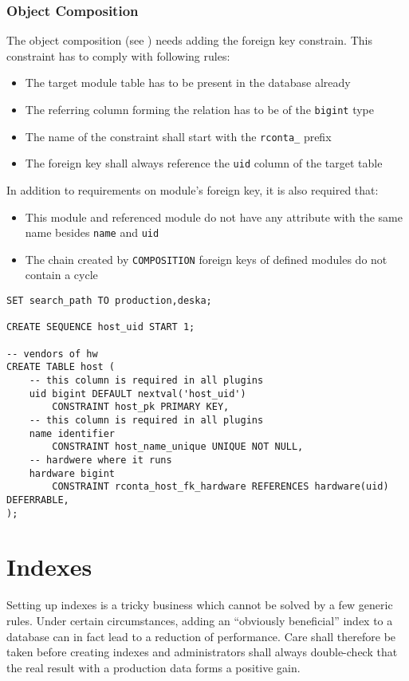 \documentclass[deska]{subfiles}
\begin{document}
\subsubsection{Object Composition}

The object composition (see ) needs adding the foreign key constrain. This constraint has
to comply with following rules:

\begin{itemize}
    \item The target module table has to be present in the database already
    \item The referring column forming the relation has to be of the {\tt bigint} type
    \item The name of the constraint shall start with the {\tt rconta\_} prefix
    \item The foreign key shall always reference the {\tt uid} column of the target table
\end{itemize}

In addition to requirements on module's foreign key, it is also required that:

\begin{itemize}
    \item This module and referenced module do not have any attribute with the same name besides {\tt name} and {\tt uid}
    \item The chain created by {\tt COMPOSITION} foreign keys of defined modules do not contain a cycle
\end{itemize}

\begin{verbatim}
SET search_path TO production,deska;

CREATE SEQUENCE host_uid START 1;

-- vendors of hw
CREATE TABLE host (
    -- this column is required in all plugins
    uid bigint DEFAULT nextval('host_uid')
        CONSTRAINT host_pk PRIMARY KEY,
    -- this column is required in all plugins
    name identifier
        CONSTRAINT host_name_unique UNIQUE NOT NULL,
    -- hardwere where it runs
    hardware bigint
        CONSTRAINT rconta_host_fk_hardware REFERENCES hardware(uid) DEFERRABLE,
);
\end{verbatim}

\section{Indexes}

Setting up indexes is a tricky business which cannot be solved by a few generic rules.  Under certain circumstances,
adding an ``obviously beneficial'' index to a database can in fact lead to a reduction of performance.  Care shall
therefore be taken before creating indexes and administrators shall always double-check that the real result with a
production data forms a positive gain.
\end{document}

